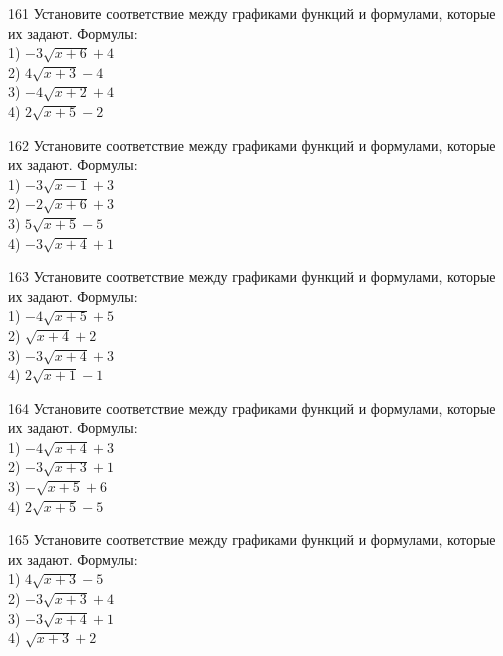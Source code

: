 \documentclass[4apaper]{article}
\begin{document}
\begin{taskBN}{161}
Установите соответствие между графиками функций и формулами, которые их задают. Формулы: \\1) $-3\sqrt{x+6}+4$\\2) $4\sqrt{x+3}-4$\\3) $-4\sqrt{x+2}+4$\\4) $2\sqrt{x+5}-2$
\end{taskBN}

\begin{taskBN}{162}
Установите соответствие между графиками функций и формулами, которые их задают. Формулы: \\1) $-3\sqrt{x-1}+3$\\2) $-2\sqrt{x+6}+3$\\3) $5\sqrt{x+5}-5$\\4) $-3\sqrt{x+4}+1$
\end{taskBN}

\begin{taskBN}{163}
Установите соответствие между графиками функций и формулами, которые их задают. Формулы: \\1) $-4\sqrt{x+5}+5$\\2) $\sqrt{x+4}+2$\\3) $-3\sqrt{x+4}+3$\\4) $2\sqrt{x+1}-1$
\end{taskBN}

\begin{taskBN}{164}
Установите соответствие между графиками функций и формулами, которые их задают. Формулы: \\1) $-4\sqrt{x+4}+3$\\2) $-3\sqrt{x+3}+1$\\3) $-\sqrt{x+5}+6$\\4) $2\sqrt{x+5}-5$
\end{taskBN}

\begin{taskBN}{165}
Установите соответствие между графиками функций и формулами, которые их задают. Формулы: \\1) $4\sqrt{x+3}-5$\\2) $-3\sqrt{x+3}+4$\\3) $-3\sqrt{x+4}+1$\\4) $\sqrt{x+3}+2$
\end{taskBN}
\end{document}
